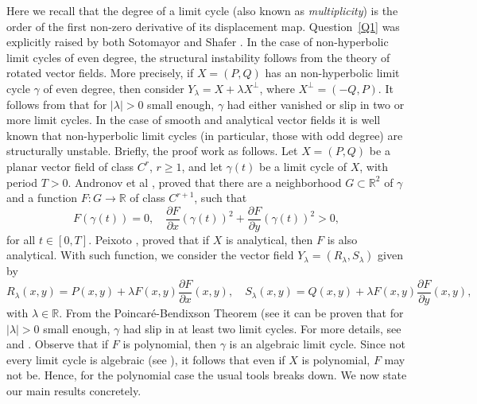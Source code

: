 \documentclass[11pt]{amsart}
\begin{document}
Here we recall that the degree of a limit cycle (also known as \emph{multiplicity}) is the order of the first non-zero derivative of its displacement map. Question~\ref{Q1} was explicitly raised by both Sotomayor \cite[Problem $1.1$]{Soto1985} and Shafer \cite[Question $3.4$]{Sha1987}. In the case of non-hyperbolic limit cycles of even degree, the structural instability follows from the theory of rotated vector fields. More precisely, if $X=(P,Q)$ has an non-hyperbolic limit cycle $\gamma$ of even degree, then consider $Y_\lambda=X+\lambda X^\perp$, where $X^\perp=(-Q,P)$. It follows from \cite[Theorem $2$, p. $387$]{Perko2001} that for $|\lambda|>0$ small enough, $\gamma$ had either vanished or slip in two or more limit cycles. In the case of smooth and analytical vector fields it is well known that non-hyperbolic limit cycles (in particular, those with odd degree) are structurally unstable. Briefly, the proof work as follows. Let $X=(P,Q)$ be a planar vector field of class $C^r$, $r\geqslant 1$, and let $\gamma(t)$ be a limit cycle of $X$, with period $T>0$. Andronov et al \cite[p. 124]{And1971}, proved that there are a neighborhood $G\subset\mathbb{R}^2$ of $\gamma$ and a function $F\colon G\to\mathbb{R}$ of class $C^{r+1}$, such that 
	\[F(\gamma(t))=0, \quad \frac{\partial F}{\partial x}(\gamma(t))^2+\frac{\partial F}{\partial y}(\gamma(t))^2>0,\]
for all $t\in[0,T]$. Peixoto \cite[Lemma~$6$]{Pei1959}, proved that if $X$ is analytical, then $F$ is also analytical. With such function, we consider the vector field $Y_\lambda=(R_\lambda,S_\lambda)$ given by
	\[R_\lambda(x,y)=P(x,y)+\lambda F(x,y)\frac{\partial F}{\partial x}(x,y), \quad S_\lambda(x,y)=Q(x,y)+\lambda F(x,y)\frac{\partial F}{\partial y}(x,y),\]
with $\lambda\in\mathbb{R}$. From the Poincar\'e-Bendixson Theorem (see \cite[Section $1.7$]{DumLliArt2006} it can be proven that for $|\lambda|>0$ small enough, $\gamma$ had slip in at least two limit cycles. For more details, see \cite[$\mathsection15$]{And1971} and \cite[Lemma~$6$]{Pei1959}. Observe that if $F$ is polynomial, then $\gamma$ is an algebraic limit cycle. Since not every limit cycle is algebraic (see \cite{GasGiaTor2007}), it follows that even if $X$ is polynomial, $F$ may not be. Hence, for the polynomial case the usual tools breaks down. We now state our main results concretely.
\end{document}
